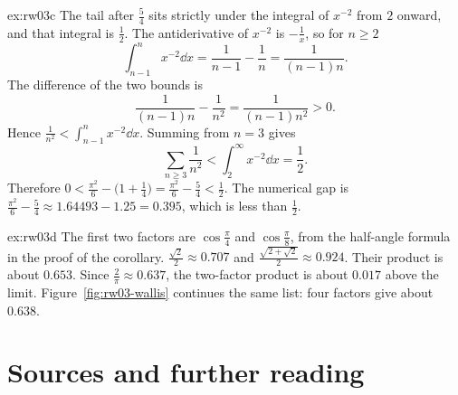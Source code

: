\begin{solution}{ex:rw03c}
\idea The tail after $\frac54$ sits strictly under the integral of $x^{-2}$ from $2$ onward, and that integral is $\frac12$.
\writeup The antiderivative of $x^{-2}$ is $-\frac1x$, so for $n\ge2$
\[
\int_{n-1}^n x^{-2}\dd x=\frac1{n-1}-\frac1n=\frac1{(n-1)n}.
\]
The difference of the two bounds is
\[
\frac1{(n-1)n}-\frac1{n^2}=\frac1{(n-1)n^2}>0.
\]
Hence $\frac1{n^2}<\int_{n-1}^n x^{-2}\dd x$. Summing from $n=3$ gives
\[
\sum_{n\ge3}\frac1{n^2}<\int_2^\infty x^{-2}\dd x=\frac12.
\]
Therefore $0<\frac{\pi^2}6-\bigl(1+\frac14\bigr)=\frac{\pi^2}6-\frac54<\frac12$. The numerical gap is $\frac{\pi^2}6-\frac54\approx1.64493-1.25=0.395$, which is less than $\frac12$.
\end{solution}

\begin{solution}{ex:rw03d}
\idea The first two factors are $\cos\frac\pi4$ and $\cos\frac\pi8$, from the half-angle formula in the proof of the corollary.
\writeup $\frac{\sqrt2}2\approx0.707$ and $\frac{\sqrt{2+\sqrt2}}2\approx0.924$. Their product is about $0.653$. Since $\frac2\pi\approx0.637$, the two-factor product is about $0.017$ above the limit. Figure~\ref{fig:rw03-wallis} continues the same list: four factors give about $0.638$.
\end{solution}

\section*{Sources and further reading}

